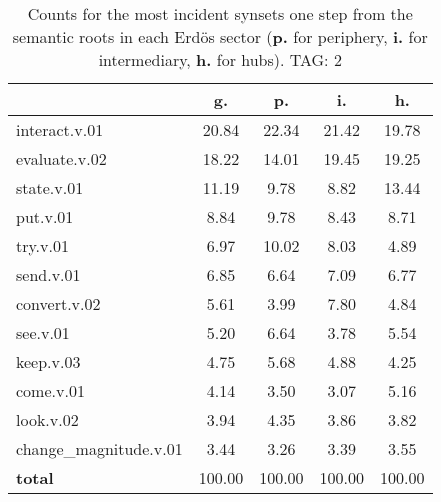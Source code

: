 \begin{table}[h!]
\begin{center}
\begin{tabular}{| l | c | c | c | c |}\hline
 & g. & p. & i. & h. \\\hline
interact.v.01 & 20.84  & 22.34  & 21.42  & 19.78 \\\hline
evaluate.v.02 & 18.22  & 14.01  & 19.45  & 19.25 \\\hline
state.v.01 & 11.19  & 9.78  & 8.82  & 13.44 \\\hline
put.v.01 & 8.84  & 9.78  & 8.43  & 8.71 \\\hline
try.v.01 & 6.97  & 10.02  & 8.03  & 4.89 \\\hline
send.v.01 & 6.85  & 6.64  & 7.09  & 6.77 \\\hline
convert.v.02 & 5.61  & 3.99  & 7.80  & 4.84 \\\hline
see.v.01 & 5.20  & 6.64  & 3.78  & 5.54 \\\hline
keep.v.03 & 4.75  & 5.68  & 4.88  & 4.25 \\\hline
come.v.01 & 4.14  & 3.50  & 3.07  & 5.16 \\\hline
look.v.02 & 3.94  & 4.35  & 3.86  & 3.82 \\\hline
change\_magnitude.v.01 & 3.44  & 3.26  & 3.39  & 3.55 \\\hline
{{\bf total}} & 100.00  & 100.00  & 100.00  & 100.00 \\\hline
\end{tabular}
\caption{Counts for the most incident synsets one step from the semantic roots in each Erd\"os sector ({\bf p.} for periphery, {\bf i.} for intermediary, {\bf h.} for hubs). TAG: 2}
\end{center}
\end{table}